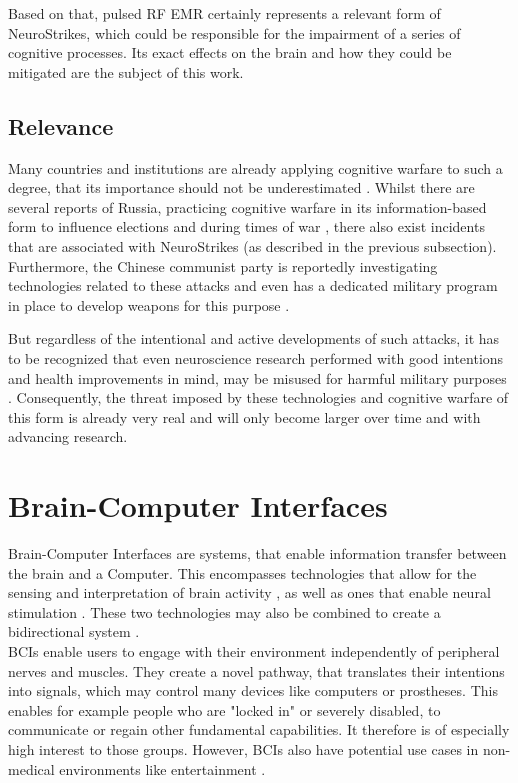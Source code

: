         Based on that, pulsed RF EMR certainly represents a relevant form of NeuroStrikes, which could be responsible for the impairment of a series of cognitive processes. Its exact effects on the brain and how they could be mitigated are the subject of this work.
        

    \subsection{Relevance}
        Many countries and institutions are already applying cognitive warfare to such a degree, that its importance should not be underestimated \cite{Claverie.2022}. Whilst there are several reports of Russia, practicing cognitive warfare in its information-based form to influence elections \cite{Backes.2019} and during times of war \cite{MAKSYMENKO.2023}, there also exist incidents that are associated with NeuroStrikes (as described in the previous subsection). Furthermore, the Chinese communist party is reportedly investigating technologies related to these attacks \cite{McCreight.2024} and even has a dedicated military program in place to develop weapons for this purpose \cite{EADS.2023}.
        
        But regardless of the intentional and active developments of such attacks, it has to be recognized that even neuroscience research performed with good intentions and health improvements in mind, may be misused for harmful military purposes \cite{McCreight.2024}. Consequently, the threat imposed by these technologies and cognitive warfare of this form is already very real and will only become larger over time and with advancing research.



\section{Brain-Computer Interfaces}
    Brain-Computer Interfaces are systems, that enable information transfer between the brain and a Computer. This encompasses technologies that allow for the sensing and interpretation of brain activity \cite{NicolasAlonso.2012}, as well as ones that enable neural stimulation \cite{WilliamJ.Tyler.2017}. These two technologies may also be combined to create a bidirectional system \cite{Rao.2019}.\\
    BCIs enable users to engage with their environment independently of peripheral nerves and muscles. They create a novel pathway, that translates their intentions into signals, which may control many devices like computers or prostheses. This enables for example people who are "locked in" or severely disabled, to communicate or regain other fundamental capabilities. It therefore is of especially high interest to those groups. However, BCIs also have potential use cases in non-medical environments like entertainment \cite{NicolasAlonso.2012}.
    
